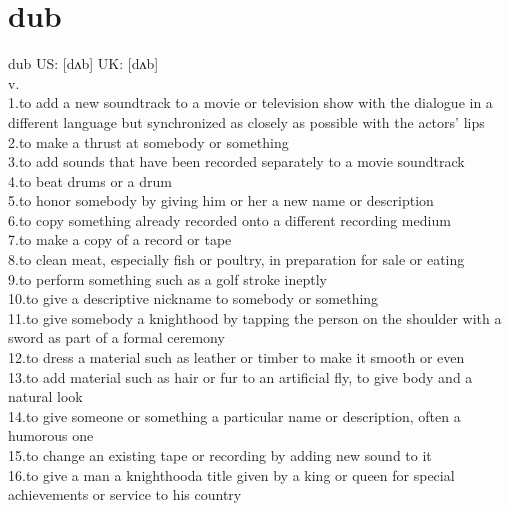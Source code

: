 \documentclass[11pt]{article}
\begin{document}
\section{dub}
\label{sec:org773834c}
dub US: [dʌb] UK: [dʌb]\\
v.\\
1.to add a new soundtrack to a movie or television show with the dialogue in a different language but synchronized as closely as possible with the actors' lips\\
2.to make a thrust at somebody or something\\
3.to add sounds that have been recorded separately to a movie soundtrack\\
4.to beat drums or a drum\\
5.to honor somebody by giving him or her a new name or description\\
6.to copy something already recorded onto a different recording medium\\
7.to make a copy of a record or tape\\
8.to clean meat, especially fish or poultry, in preparation for sale or eating\\
9.to perform something such as a golf stroke ineptly\\
10.to give a descriptive nickname to somebody or something\\
11.to give somebody a knighthood by tapping the person on the shoulder with a sword as part of a formal ceremony\\
12.to dress a material such as leather or timber to make it smooth or even\\
13.to add material such as hair or fur to an artificial fly, to give body and a natural look\\
14.to give someone or something a particular name or description, often a humorous one\\
15.to change an existing tape or recording by adding new sound to it\\
16.to give a man a knighthooda title given by a king or queen for special achievements or service to his country\\
\end{document}
